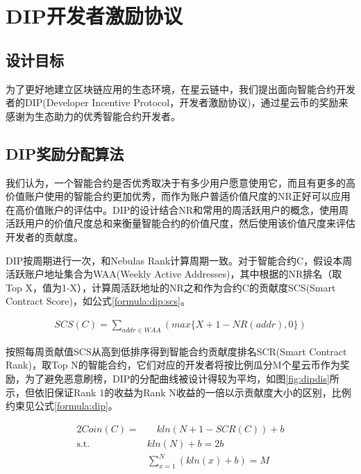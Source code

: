 \section{DIP开发者激励协议}
\label{sec:dip}

\subsection{设计目标}
\label{dip:design}
为了更好地建立区块链应用的生态环境，在星云链中，我们提出面向智能合约开发者的DIP(Developer Incentive Protocol，开发者激励协议)，通过星云币的奖励来感谢为生态助力的优秀智能合约开发者。

\subsection{DIP奖励分配算法}
\label{dip:arith}
我们认为，一个智能合约是否优秀取决于有多少用户愿意使用它，而且有更多的高价值账户使用的智能合约更加优秀，而作为账户普适价值尺度的NR正好可以应用在高价值账户的评估中。DIP的设计结合NR和常用的周活跃用户的概念，使用周活跃用户的价值尺度总和来衡量智能合约的价值尺度，然后使用该价值尺度来评估开发者的贡献度。

DIP按周期进行一次，和Nebulas Rank计算周期一致。对于智能合约C，假设本周活跃账户地址集合为WAA(Weekly Active Addresses)，其中根据的NR排名（取Top X，值为1-X），计算周活跃地址的NR之和作为合约C的贡献度SCS(Smart Contract Score)，如公式\ref{formula:dip:scs}。

\begin{align}
\label{formula:dip:scs}
SCS(C)=\sum_{addr \in WAA}(max\{X + 1 - NR(addr), 0\})
\end{align}

按照每周贡献值SCS从高到低排序得到智能合约贡献度排名SCR(Smart Contract Rank)，取Top N的智能合约，它们对应的开发者将按比例瓜分M个星云币作为奖励，为了避免恶意刷榜，DIP的分配曲线被设计得较为平均，如图\ref{fig:dipdis}所示，但依旧保证Rank 1的收益为Rank N收益的一倍以示贡献度大小的区别，比例约束见公式\ref{formula:dip}。

\begin{alignat}{2}
Coin(C) = & \quad kln(N+1-SCR(C))+b \label{formula:dip} \\
\mbox{s.t.}\quad & kln(N) + b = 2b \nonumber \\
& \sum_{x=1}^{N}(kln(x) + b) = M \nonumber
\end{alignat}

